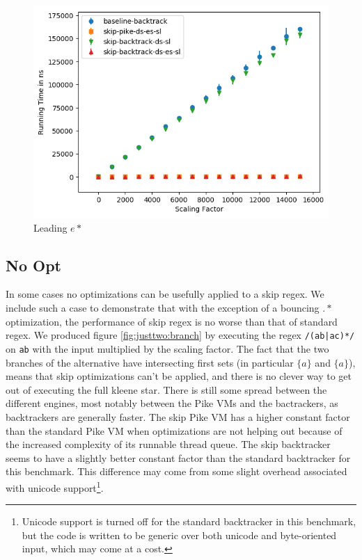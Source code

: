 \begin{figure}
\label{fig:leading:noncontaining:estar}
\caption{Leading $e*$}
\includegraphics{resources/leading-noncontaining-estar.png}
\end{figure}

\subsection{No Opt}

In some cases no optimizations can be usefully applied to a skip
regex. We include such a case to demonstrate that with the exception
of a bouncing $.*$ optimization, the performance of skip regex is
no worse than that of standard regex. We produced figure 
\ref{fig:justtwo:branch}
by executing the regex \verb'/(ab|ac)*/' on \verb'ab' with
the input multiplied by the scaling factor. The fact that the
two branches of the alternative have intersecting first sets
(in particular $\{a\}$ and $\{a\}$), means that skip optimizations
can't be applied, and there is no clever way to get out of
executing the full kleene star. There is still some spread between
the different engines, most notably between the Pike VMs and the
bactrackers, as backtrackers are generally faster. The skip Pike VM
has a higher constant factor than the standard Pike VM when optimizations
are not helping out because of the increased complexity of its runnable
thread queue. The skip backtracker seems to have a slightly better
constant factor than the standard backtracker for this benchmark.
This difference may come from some slight overhead associated with
unicode support\footnote{Unicode support is turned off for the
standard backtracker in this benchmark, but the code is written
to be generic over both unicode and byte-oriented input, which
may come at a cost.}.

